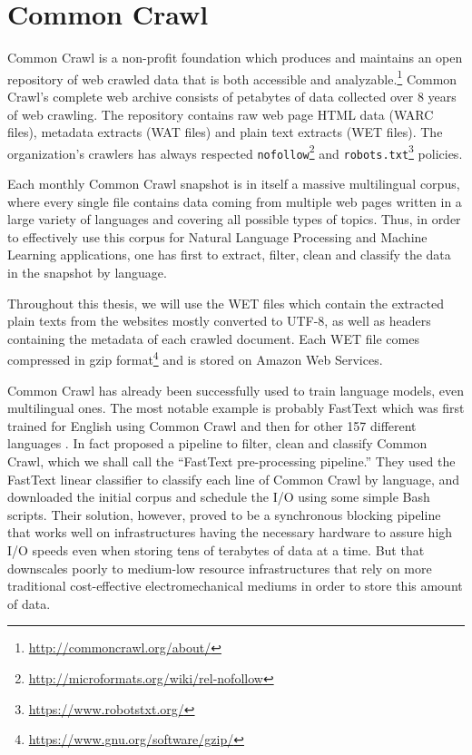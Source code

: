 \section{Common Crawl}

Common Crawl is a non-profit foundation which produces and maintains an open repository of web crawled data that is both accessible and analyzable.\footnote{\url{http://commoncrawl.org/about/}} Common Crawl's complete web archive consists of petabytes of data collected over 8 years of web crawling. The repository contains raw web page HTML data (WARC files), metadata extracts (WAT files) and plain text extracts (WET files). The organization's crawlers has always respected \texttt{nofollow}\footnote{\url{http://microformats.org/wiki/rel-nofollow}} and \texttt{robots.txt}\footnote{\url{https://www.robotstxt.org/}} policies.

Each monthly Common Crawl snapshot is in itself a massive multilingual corpus, where every single file contains data coming from multiple web pages written in a large variety of languages and covering all possible types of topics. Thus, in order to effectively use this corpus for Natural Language Processing and Machine Learning applications, one has first to extract, filter, clean and classify the data in the snapshot by language.

Throughout this thesis, we will use the WET files which contain the extracted plain texts from the websites mostly converted to UTF-8, as well as headers containing the metadata of each crawled document. Each WET file comes compressed in gzip format\footnote{\url{https://www.gnu.org/software/gzip/}} and is stored on Amazon Web Services.

Common Crawl has already been successfully used to train language models, even multilingual ones. The most notable example is probably FastText which was first trained for English using Common Crawl \citep{mikolov-etal-2018-advances} and then for other 157 different languages \citep{grave-etal-2018-learning}. In fact \citet{grave-etal-2018-learning} proposed a pipeline to filter, clean and classify Common Crawl, which we shall call the ``FastText pre-processing pipeline.'' They used the FastText linear classifier \citep{joulin-etal-2016-fasttext, joulin-etal-2017-bag} to classify each line of Common Crawl by language, and downloaded the initial corpus and schedule the I/O using some simple Bash scripts. Their solution, however, proved to be a synchronous blocking pipeline that works well on infrastructures having the necessary hardware to assure high I/O speeds even when storing tens of terabytes of data at a time. But that downscales poorly to medium-low resource infrastructures that rely on more traditional cost-effective electromechanical mediums in order to store this amount of data.

